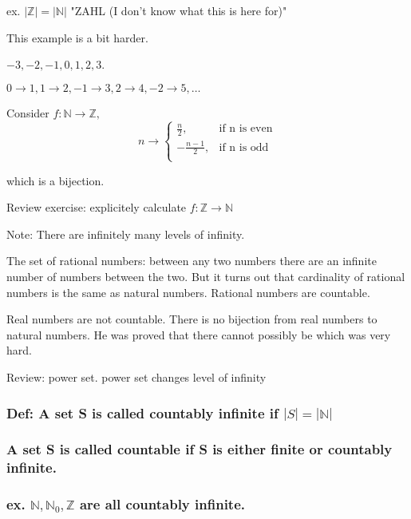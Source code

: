 \documentclass{article}
\begin{document}
ex. $|\mathbb{Z}| = |\mathbb{N}|$ "ZAHL (I don't know what this is here for)"

This example is a bit harder.

 $-3, -2, -1, 0, 1, 2, 3$.

 $0 \to 1, 1 \to 2, -1 \to 3, 2 \to 4, -2 \to 5, \dots$

 Consider  $f: \mathbb{N} \to \mathbb{Z}, $
 \[n \to
   \begin{cases} 
     \frac{n}{2}, & \text{if n is even} \\
     -\frac{n-1}{2}, & \text{if n is odd} \\
   \end{cases}
 \]

 which is a bijection.

 Review exercise: explicitely calculate $f: \mathbb{Z} \to \mathbb{N}$

 Note: There are infinitely many levels of infinity.

 The set of rational numbers: between any two numbers there are an infinite number of numbers between the two. But it turns out that cardinality of rational numbers is the same as natural numbers. Rational numbers are countable.

 Real numbers are not countable. There is no bijection from real numbers to natural numbers. He was proved that there cannot possibly be which was very hard.

 Review: power set. power set changes level of infinity


 \subsubsection*{ Def: A set S is called countably infinite if  $|S| = |\mathbb{N}|$ }

 \subsubsection*{A set S is called countable if S is either finite or countably infinite.}

 \subsubsection*{ex. $\mathbb{N}, \mathbb{N}_0, \mathbb{Z}$ are all countably infinite.}

\end{document}
